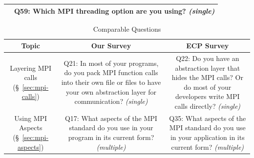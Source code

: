 \documentclass[preprint,5p,times]{elsarticle}
\begin{document}
{\begin{table}[tb]
\begin{center}
\begin{tabular}[t]{c|c}
\begin{minipage}[t]{0.45\hsize}
      \end{minipage}
      &
      \begin{minipage}[t]{0.45\hsize}
        Q59: Which MPI threading option are you using? {\it(single)}
      \end{minipage}
      \\
      \hline
    \end{tabular}%
  \end{center}%
\end{table}%
}{
  \begin{table}[tb]%
    \small
  \begin{center}%
    \caption{Comparable Questions}%
    \label{tab:comparable-questions}%
    \vspace{-1.5mm}
    \begin{tabular}[t]{c||c|c}
      \hline
      Topic & Our Survey & ECP Survey \\
      \hline
      \hline
      \begin{minipage}[t]{0.15\hsize}
        Layering MPI calls
        (\S~\ref{sec:mpi-calls})
      \end{minipage}
      &
      \begin{minipage}[t]{0.38\hsize}
        Q21: In most of your programs, do you pack MPI function calls into
        their own file or files to have your own abstraction layer for
        communication?  {\it(single)}
      \end{minipage}
      &
      \begin{minipage}[t]{0.38\hsize}
        Q22: Do you have an abstraction layer that hides the MPI calls? Or do
        most of your developers write MPI calls directly? {\it(single)}
      \end{minipage}
      \\
      \hline
      \begin{minipage}[t]{0.15\hsize}
        Using MPI Aspects
        (\S~\ref{sec:mpi-aspects})
      \end{minipage}
      &
      \begin{minipage}[t]{0.38\hsize}
        Q17: What aspects of the MPI standard do you use in your program in its
        current form? {\it(multiple)}
      \end{minipage}
      &
      \begin{minipage}[t]{0.38\hsize}
        Q35: What aspects of the MPI standard do you use in your application in
        its current form? {\it(multiple)}
      \end{minipage}
      \\

\end{tabular}
\end{center}
\end{table}}
\end{document}
